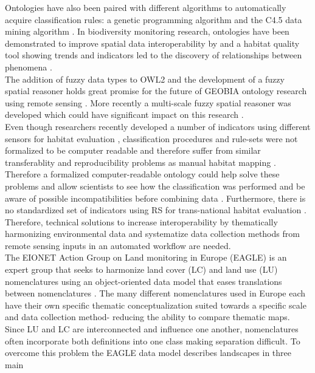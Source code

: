 \documentclass[authoryear, review,12pt,number]{elsarticle}
\begin{document}
Ontologies have also been paired with different algorithms to automatically
acquire classification rules: a genetic programming algorithm
\citep{Forestier2012470} and the C4.5 data mining algorithm
\citep{Sheeren2006ML}. In biodiversity monitoring research, ontologies have been
demonstrated to improve spatial data interoperability by \cite{Nieland2015} and
a habitat quality tool showing trends and indicators led to the discovery of
relationships between phenomena \citep{Perez-Luque2015}. 
\\
The addition of fuzzy data types to OWL2 and the development of a fuzzy spatial
reasoner holds great promise for the future of GEOBIA ontology research using
remote sensing \citep{Bobillo2011, Bobillo2015}. More recently a multi-scale
fuzzy spatial reasoner was developed which could have significant impact on this
research \citep{Argyridis2015}.
\\
Even though researchers recently developed a number of indicators using
different sensors for habitat evaluation \citep{Nagendra2013}, classification
procedures and rule-sets were not formalized to be computer readable and
therefore suffer from similar transferablity and reproducibility problems as
manual habitat mapping \citep{Arvor2013, Nieland2015}. Therefore a formalized
computer-readable ontology could help solve these problems and allow scientists
to see how the classification was performed and be aware of possible
incompatibilities before combining data \citep{Janowicz2012}.  Furthermore,
there is no standardized set of indicators using RS for trans-national habitat
evaluation \citep{Lucas2015, VandenBorre2011}. Therefore, technical solutions to
increase interoperability by thematically harmonizing environmental data and
systematize data collection methods from remote sensing inputs in an automated
workflow are needed. 
\\
The EIONET Action Group on Land monitoring in Europe (EAGLE) is an expert group
that seeks to harmonize land cover (LC) and land use (LU) nomenclatures using an
object-oriented data model that eases translations between nomenclatures
\citep{arnold2013eagle}. The many different nomenclatures used in Europe each
have their own specific thematic conceptualization suited towards a specific
scale and data collection method- reducing the ability to compare thematic maps.
Since LU and LC are interconnected and influence one another, nomenclatures
often incorporate both definitions into one class making separation difficult.
To overcome this problem the EAGLE data model describes landscapes in three main
\end{document}
